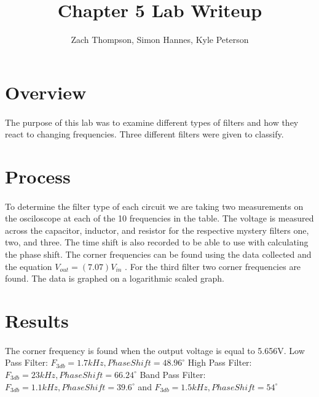 \documentclass{article}
\title{Chapter 5 Lab Writeup}
\author{Zach Thompson, Simon Hannes, Kyle Peterson}
\begin{document}
\maketitle{}

\section*{Overview}
\paragraph{}
The purpose of this lab was to examine different types of filters and how they react to changing frequencies.
Three different filters were given to classify.



\section*{Process}
\paragraph{}
To determine the filter type of each circuit we are taking two measurements on the osciloscope at each of the 
10 frequencies in the table. The voltage is measured across the capacitor, inductor, and resistor for the 
respective mystery filters one, two, and three. The time shift is also recorded to be able to use with 
calculating the phase shift. The corner frequencies can be found using the data collected and the equation 
$ V_{out} = (7.07)   V_{in}$ . For the third filter two corner frequencies are found. The data is graphed on 
a logarithmic scaled graph.

\section*{Results}
\paragraph{}
The corner frequency is found when the output voltage is equal to 5.656V.
Low Pass Filter: $F_{3db} = 1.7kHz, Phase Shift = 48.96^{\circ}$
High Pass Filter: $F_{3db} = 23kHz, Phase Shift = 66.24^{\circ}$
Band Pass Filter: $F_{3db} = 1.1kHz, Phase Shift = 39.6^{\circ}$
and $F_{3db} = 1.5kHz, Phase Shift = 54^{\circ}$
\end{document}
